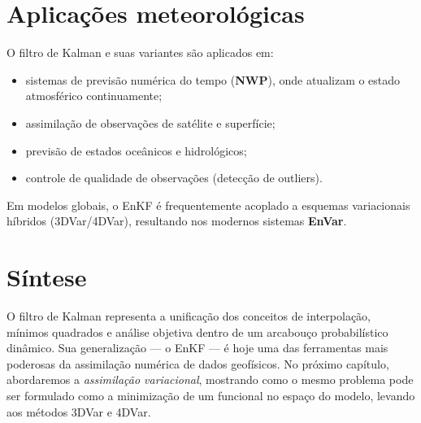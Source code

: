 \section{Aplicações meteorológicas}
O filtro de Kalman e suas variantes são aplicados em:
\begin{itemize}
  \item sistemas de previsão numérica do tempo (\textbf{NWP}), onde atualizam o estado atmosférico continuamente;
  \item assimilação de observações de satélite e superfície;
  \item previsão de estados oceânicos e hidrológicos;
  \item controle de qualidade de observações (detecção de outliers).
\end{itemize}
Em modelos globais, o EnKF é frequentemente acoplado a esquemas variacionais híbridos (3DVar/4DVar), resultando nos modernos sistemas \textbf{EnVar}.

\section{Síntese}
O filtro de Kalman representa a unificação dos conceitos de interpolação, mínimos quadrados e análise objetiva dentro de um arcabouço probabilístico dinâmico.  
Sua generalização — o EnKF — é hoje uma das ferramentas mais poderosas da assimilação numérica de dados geofísicos.  
No próximo capítulo, abordaremos a \emph{assimilação variacional}, mostrando como o mesmo problema pode ser formulado como a minimização de um funcional no espaço do modelo, levando aos métodos 3DVar e 4DVar.

